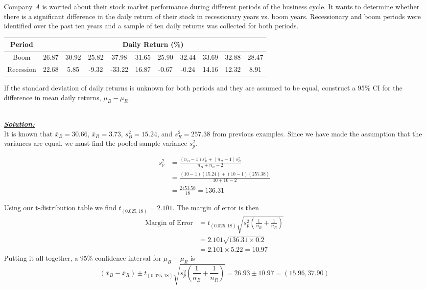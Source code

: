 \begin{example}
Company $A$ is worried about their stock market performance during different periods of the business cycle. It wants to determine whether there is a significant difference in the daily return of their stock in recessionary years vs. boom years. Recessionary and boom periods were identified over the past ten years and a sample of ten daily returns was collected for both periods. 

\begin{center}
\begin{tabular}{c|c|c|c|c|c|c|c|c|c|c}
\def\arraystretch{2}
Period & \multicolumn{10}{c}{Daily Return (\%)} \\ 
\hline %
Boom & 26.87& 30.92 &25.82& 37.98& 31.65& 25.90 &32.44 &33.69& 32.88& 28.47 \\ 
\hline 
Recession & 22.68  & 5.85&  -9.32& -33.22&  16.87  &-0.67 & -0.24 & 14.16&  12.32&   8.91
\end{tabular} 
\end{center}

If the standard deviation of daily returns is unknown for both periods and they are assumed to be equal, construct a 95\% CI for the difference in mean daily returns, $\mu_B - \mu_R$.

\hfill\\
{\emph{\textbf{\underline{Solution:}}}}\\


It is known that $\bar{x}_B = 30.66$, $\bar{x}_R=3.73$, $s^{2}_B=15.24$, and $s^{2}_R=257.38$ from previous examples. Since we have made the assumption that the variances are equal, we must find the pooled sample variance $s^2_p$. 

\begin{align*}
s^{2}_p &= \frac{(n_B-1) s_B^2 + (n_R-1) s_R^2}{n_B+n_R-2} \\
		&= \frac{(10-1)(15.24) + (10-1)(257.38)}{10+10-2} \\
		&= \frac{2453.58}{18} = 136.31
\end{align*}

Using our t-distribution table we find $t_{(0.025,18)}=2.101$. The margin of error is then
\begin{align*}
\text{Margin of Error}	&=t_{(0.025,18)}\sqrt{s_p^{2} \left(\frac{1}{n_B}+\frac{1}{n_R}\right)} \\
						&= 2.101 \sqrt{136.31 \times 0.2} \\
						&= 2.101 \times 5.22 = 10.97
\end{align*}
Putting it all together, a 95\% confidence interval for $\mu_B-\mu_R$ is
\[ (\bar{x}_B - \bar{x}_R) \pm t_{(0.025,18)}\sqrt{s_p^{2} \left(\frac{1}{n_B}+\frac{1}{n_R}\right)} = 26.93 \pm 10.97 = (15.96,37.90)\]


\end{example}
